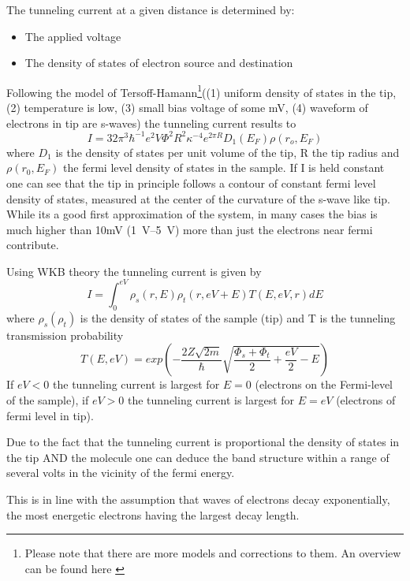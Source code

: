 The tunneling current at a given distance is determined by:
\begin{itemize}
 \item The applied voltage
 \item The density of states of electron source and destination
\end{itemize}

Following the model of  Tersoff-Hamann\footnote{Please note that there are more models and corrections to them. An overview can be found here \cite{lounis_theory_2014}}((1) uniform density of states in the tip, (2) temperature is low, (3) small bias voltage of some mV, (4) waveform of electrons in tip are s-waves) the tunneling current results to 
$$I=32\pi^3\hbar^{-1}e^2V\Phi^2 R^2\kappa^{-4}e^{2\pi R}D_1(E_F)\rho(r_o,E_F)$$ where $D_1$ is the density of states per unit volume of the tip, R the tip radius and $\rho(r_0,E_F)$ the fermi level density of states in the sample. If I is held constant one can see that the tip in principle follows a contour of constant fermi level density of states, measured at the center of the curvature of the s-wave like tip. While its a good first approximation of the system, in many cases the bias is much higher than 10mV (\SIrange{1}{5}{\V}) more than just the electrons near fermi contribute.

Using  WKB theory the tunneling current is given by
\begin{equation}
I=\int_0^{eV}\rho_s(r,E)\rho_t(r,eV+E)T(E,eV,r)dE
\label{WKB}
\end{equation}
where $\rho_s(\rho_t)$ is the density of states of the sample (tip) and T is the tunneling transmission probability
\begin{equation}
T(E,eV)=exp\left(-\frac{2Z\sqrt{2m}}{\hbar}\sqrt{\frac{\Phi_s+\Phi_t}{2}+\frac{eV}{2}-E}\right)
\label{Transmission-function} 
\end{equation}
If $eV<0$ the tunneling current is largest for $E=0$ (electrons on the Fermi-level of the sample), if $eV>0$ the tunneling current is largest for $E=eV$ (electrons of fermi level in tip).

Due to the fact that the tunneling current is proportional the density of states in the tip AND the molecule one can deduce the band structure within a range of several volts in the vicinity of the fermi energy.

This is in line with the assumption that waves of electrons decay exponentially, the most energetic electrons having the largest decay length.